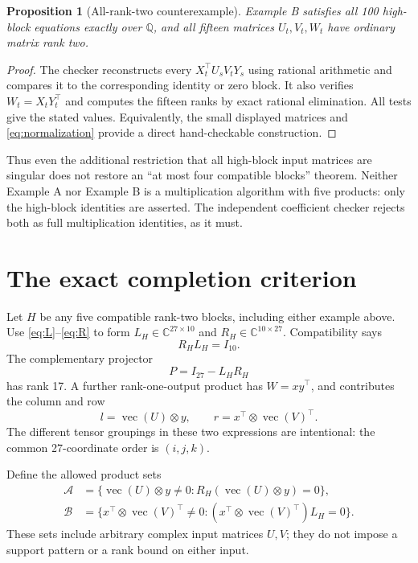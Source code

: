 \documentclass[11pt]{article}
\newtheorem{proposition}[theorem]{Proposition}
\theoremstyle{definition}\newtheorem{definition}[theorem]{Definition}
\newcommand{\C}{\mathbb C}\newcommand{\Q}{\mathbb Q}
\newcommand{\vecm}{\operatorname{vec}}
\begin{document}
\begin{proposition}[All-rank-two counterexample]\label{prop:alltwo}
Example B satisfies all 100 high-block equations exactly over $\Q$, and all fifteen matrices $U_t,V_t,W_t$ have ordinary matrix rank two.
\end{proposition}
\begin{proof}
The checker reconstructs every $X_t^\top U_sV_tY_s$ using rational arithmetic and compares it to the corresponding identity or zero block. It also verifies $W_t=X_tY_t^\top$ and computes the fifteen ranks by exact rational elimination. All tests give the stated values. Equivalently, the small displayed matrices and \eqref{eq:normalization} provide a direct hand-checkable construction.
\end{proof}

Thus even the additional restriction that all high-block input matrices are singular does not restore an ``at most four compatible blocks'' theorem. Neither Example A nor Example B is a multiplication algorithm with five products: only the high-block identities are asserted. The independent coefficient checker rejects both as full multiplication identities, as it must.

\section{The exact completion criterion}\label{sec:criterion}
Let $H$ be any five compatible rank-two blocks, including either example above. Use \eqref{eq:L}--\eqref{eq:R} to form $L_H\in\C^{27\times10}$ and $R_H\in\C^{10\times27}$. Compatibility says
\begin{equation}\label{eq:partial}
R_HL_H=I_{10}.
\end{equation}
The complementary projector
\[
P=I_{27}-L_HR_H
\]
has rank 17. A further rank-one-output product has $W=xy^\top$, and contributes the column and row
\begin{equation}\label{eq:low}
l=\vecm(U)\otimes y,\qquad r=x^\top\otimes\vecm(V)^\top.
\end{equation}
The different tensor groupings in these two expressions are intentional: the common 27-coordinate order is $(i,j,k)$.

Define the allowed product sets
\begin{align*}
\mathcal A&=\{\vecm(U)\otimes y\ne0:R_H(\vecm(U)\otimes y)=0\},\\
\mathcal B&=\{x^\top\otimes\vecm(V)^\top\ne0:(x^\top\otimes\vecm(V)^\top)L_H=0\}.
\end{align*}
These sets include arbitrary complex input matrices $U,V$; they do not impose a support pattern or a rank bound on either input.
\end{document}
